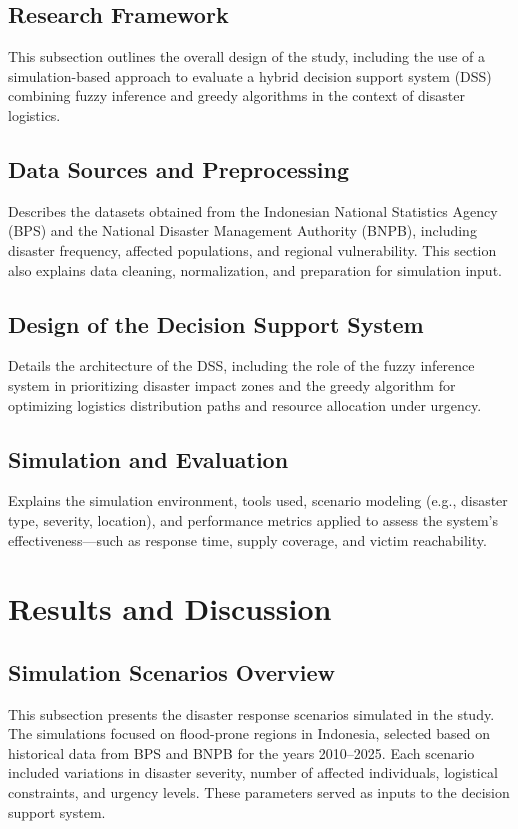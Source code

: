 \documentclass[journal,final,a4paper,twoside,11pt]{IEEEtran}
\begin{document}
\subsection{Research Framework}
This subsection outlines the overall design of the study, including the use of a simulation-based approach to evaluate a hybrid decision support system (DSS) combining fuzzy inference and greedy algorithms in the context of disaster logistics.

\subsection{Data Sources and Preprocessing}
Describes the datasets obtained from the Indonesian National Statistics Agency (BPS) and the National Disaster Management Authority (BNPB), including disaster frequency, affected populations, and regional vulnerability. This section also explains data cleaning, normalization, and preparation for simulation input.

\subsection{Design of the Decision Support System}
Details the architecture of the DSS, including the role of the fuzzy inference system in prioritizing disaster impact zones and the greedy algorithm for optimizing logistics distribution paths and resource allocation under urgency.

\subsection{Simulation and Evaluation}
Explains the simulation environment, tools used, scenario modeling (e.g., disaster type, severity, location), and performance metrics applied to assess the system’s effectiveness—such as response time, supply coverage, and victim reachability.



\section{Results and Discussion}

\subsection{Simulation Scenarios Overview}
This subsection presents the disaster response scenarios simulated in the study. The simulations focused on flood-prone regions in Indonesia, selected based on historical data from BPS and BNPB for the years 2010–2025. Each scenario included variations in disaster severity, number of affected individuals, logistical constraints, and urgency levels. These parameters served as inputs to the decision support system.
\end{document}
